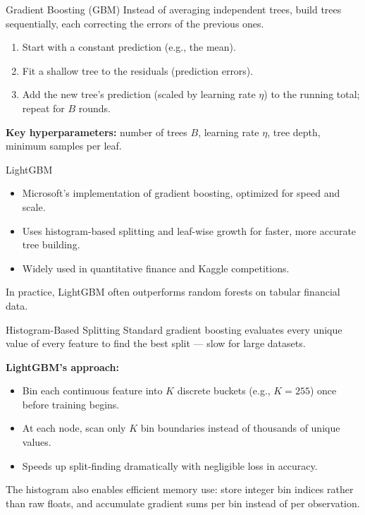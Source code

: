 \documentclass[aspectratio=169,t]{beamer}
\begin{document}
\begin{frame}{Gradient Boosting (GBM)}
Instead of averaging independent trees, build trees \alert{sequentially}, each correcting the errors of the previous ones.

\vspace{0.3cm}
\begin{enumerate}
\item Start with a constant prediction (e.g., the mean).
\item Fit a shallow tree to the \alert{residuals} (prediction errors).
\item Add the new tree's prediction (scaled by learning rate $\eta$) to the running total; repeat for $B$ rounds.
\end{enumerate}

\vspace{0.3cm}
\textbf{Key hyperparameters:} number of trees $B$, learning rate $\eta$, tree depth, minimum samples per leaf.
\end{frame}

\begin{frame}{LightGBM}
\begin{itemize}
\item Microsoft's implementation of gradient boosting, optimized for speed and scale.
\item Uses \alert{histogram-based} splitting and \alert{leaf-wise} growth for faster, more accurate tree building.
\item Widely used in quantitative finance and Kaggle competitions.
\end{itemize}

\vspace{0.3cm}
In practice, LightGBM often outperforms random forests on tabular financial data.
\end{frame}

\begin{frame}{Histogram-Based Splitting}
Standard gradient boosting evaluates every unique value of every feature to find the best split --- slow for large datasets.

\vspace{0.3cm}
\textbf{LightGBM's approach:}
\begin{itemize}
\item Bin each continuous feature into $K$ discrete buckets (e.g., $K = 255$) once before training begins.
\item At each node, scan only $K$ bin boundaries instead of thousands of unique values.
\item Speeds up split-finding dramatically with negligible loss in accuracy.
\end{itemize}

\vspace{0.3cm}
The histogram also enables \alert{efficient memory use}: store integer bin indices rather than raw floats, and accumulate gradient sums per bin instead of per observation.
\end{frame}
\end{document}
